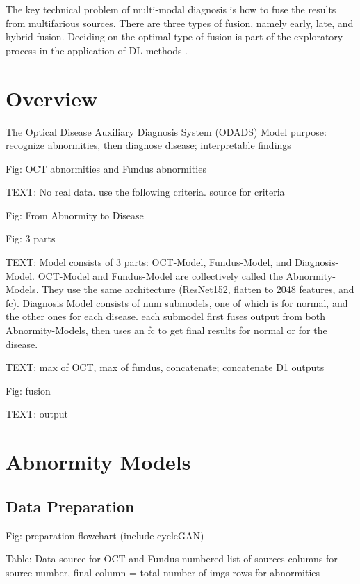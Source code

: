 \documentclass{article}
\begin{document}
		The key technical problem of multi-modal diagnosis is how to fuse the results from multifarious sources.  There are three types of fusion, namely early, late, and hybrid fusion.  Deciding on the optimal type of fusion is part of the exploratory process in the application of DL methods \autocite{Ichhpujani_Thakur_2021}.
		
		
	
	\section{Overview}
		
		The Optical Disease Auxiliary Diagnosis System (ODADS)
		Model purpose: recognize abnormities, then diagnose disease; 
			interpretable findings
			
		Fig: OCT abnormities and Fundus abnormities
		
		TEXT: No real data. use the following criteria. source for criteria
		
		Fig: From Abnormity to Disease
		
		Fig: 3 parts
		
		TEXT: Model consists of 3 parts: OCT-Model, Fundus-Model, and Diagnosis-Model. OCT-Model and Fundus-Model are collectively called the Abnormity-Models. They use the same architecture (ResNet152, flatten to 2048 features, and fc). Diagnosis Model consists of num submodels, one of which is for normal, and the other ones for each disease. each submodel first fuses output from both Abnormity-Models, then uses an fc to get final results for normal or for the disease. 
		
		TEXT: max of OCT, max of fundus, concatenate; concatenate D1 outputs
		
		Fig: fusion
		
		TEXT: output
		
	\section{Abnormity Models}
	
		\subsection{Data Preparation}
			
			Fig: preparation flowchart (include cycleGAN)
			
			Table: Data source for OCT and Fundus
				numbered list of sources
				columns for source number, final column = total number of imgs
				rows for abnormities
			
\end{document}
